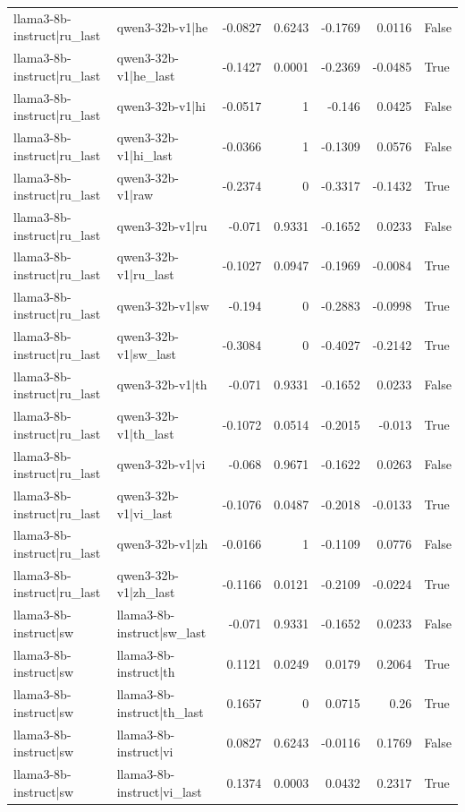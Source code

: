 \begin{table}
\begin{tabular}{l l r r r r l}
llama3-8b-instruct|ru_last & qwen3-32b-v1|he & -0.0827 & 0.6243 & -0.1769 & 0.0116 & False \\
llama3-8b-instruct|ru_last & qwen3-32b-v1|he_last & -0.1427 & 0.0001 & -0.2369 & -0.0485 & True \\
llama3-8b-instruct|ru_last & qwen3-32b-v1|hi & -0.0517 & 1 & -0.146 & 0.0425 & False \\
llama3-8b-instruct|ru_last & qwen3-32b-v1|hi_last & -0.0366 & 1 & -0.1309 & 0.0576 & False \\
llama3-8b-instruct|ru_last & qwen3-32b-v1|raw & -0.2374 & 0 & -0.3317 & -0.1432 & True \\
llama3-8b-instruct|ru_last & qwen3-32b-v1|ru & -0.071 & 0.9331 & -0.1652 & 0.0233 & False \\
llama3-8b-instruct|ru_last & qwen3-32b-v1|ru_last & -0.1027 & 0.0947 & -0.1969 & -0.0084 & True \\
llama3-8b-instruct|ru_last & qwen3-32b-v1|sw & -0.194 & 0 & -0.2883 & -0.0998 & True \\
llama3-8b-instruct|ru_last & qwen3-32b-v1|sw_last & -0.3084 & 0 & -0.4027 & -0.2142 & True \\
llama3-8b-instruct|ru_last & qwen3-32b-v1|th & -0.071 & 0.9331 & -0.1652 & 0.0233 & False \\
llama3-8b-instruct|ru_last & qwen3-32b-v1|th_last & -0.1072 & 0.0514 & -0.2015 & -0.013 & True \\
llama3-8b-instruct|ru_last & qwen3-32b-v1|vi & -0.068 & 0.9671 & -0.1622 & 0.0263 & False \\
llama3-8b-instruct|ru_last & qwen3-32b-v1|vi_last & -0.1076 & 0.0487 & -0.2018 & -0.0133 & True \\
llama3-8b-instruct|ru_last & qwen3-32b-v1|zh & -0.0166 & 1 & -0.1109 & 0.0776 & False \\
llama3-8b-instruct|ru_last & qwen3-32b-v1|zh_last & -0.1166 & 0.0121 & -0.2109 & -0.0224 & True \\
llama3-8b-instruct|sw & llama3-8b-instruct|sw_last & -0.071 & 0.9331 & -0.1652 & 0.0233 & False \\
llama3-8b-instruct|sw & llama3-8b-instruct|th & 0.1121 & 0.0249 & 0.0179 & 0.2064 & True \\
llama3-8b-instruct|sw & llama3-8b-instruct|th_last & 0.1657 & 0 & 0.0715 & 0.26 & True \\
llama3-8b-instruct|sw & llama3-8b-instruct|vi & 0.0827 & 0.6243 & -0.0116 & 0.1769 & False \\
llama3-8b-instruct|sw & llama3-8b-instruct|vi_last & 0.1374 & 0.0003 & 0.0432 & 0.2317 & True \\

\end{tabular}
\end{table}
